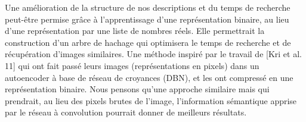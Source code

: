 Une amélioration de la structure de nos descriptions et du temps de recherche peut-être permise grâce à l'apprentissage d'une représentation binaire, au lieu d'une représentation par une liste de nombres réels. Elle permettrait la construction d'un arbre de hachage qui optimisera le temps de recherche et de récupération d'images similaires. Une méthode inspiré par le travail de [Kri et al. 11] qui ont fait passé leurs images (représentations en pixels) dans un autoencoder à base de réseau de croyances (DBN), et les ont compressé en une représentation binaire. Nous pensons qu'une approche similaire mais qui prendrait, au lieu des pixels brutes de l'image, l'information sémantique apprise par le réseau à convolution pourrait donner de meilleurs résultats.

	

